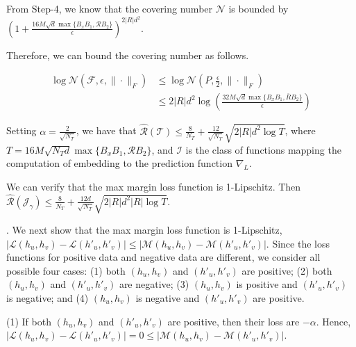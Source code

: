 From Step-4, we know that the covering number ${\mathcal N}$
is bounded by $\left(1+\frac{16M\sqrt d\max\{B_xB_1,{\mathcal R}B_2\}}
{\epsilon}\right)^{2|R|d^2}$.

Therefore, we can bound the covering number as follows.

\begin{align*}
\log \mathcal{N}(\mathcal{F},\epsilon,\|\cdot\|_F)&\leq 
\log \mathcal{N}(P,\frac{\epsilon}{2},\|\cdot\|_F)\\
&
\leq 2|R|d^2\log\left(\frac{32M\sqrt{d}\max\{B_xB_1,\overline{R}
	B_2\}}{\epsilon}\right)
\end{align*}

Setting $\alpha  = \frac{2}{\sqrt{N_T}}$, we have that 
$\hat{\mathcal{R}}(\mathcal{T})\leq\frac{8}{N_T}+
\frac{12}{\sqrt{N_T}}\sqrt{2|R|d^2\log T}$,
where $T=16M\sqrt{{N_T}d}\max\{B_xB_1,{\mathcal R}B_2\}$,
and $\mathcal{I}$ is the class of functions
mapping the computation of embedding to the prediction function $\nabla_{L}$.

We can verify that the max margin loss function 
is 1-Lipschitz.
Then ${\hat{\mathcal{R}}(\mathcal{J}_\gamma)}
\leq\frac{8}{N_T}+\frac{12d}{\sqrt{N_T}}
\sqrt{2|R|d^2|R|\log T}$.

.
We next show that the max margin loss function 
is 1-Lipschitz, 
\ie $|{\mathcal L}(h_u,h_v)-{\mathcal L}(h'_u,h'_v)|\leq 
|{\mathcal M}(h_u,h_v)-{\mathcal M}(h'_u,h'_v)|$.
Since the loss functions for positive data and negative data
are different,
we consider all possible four cases:
(1) both $(h_u,h_v)$ and $(h'_u,h'_v)$ are positive;
(2) both $(h_u,h_v)$ and $(h'_u,h'_v)$ are negative;
(3) $(h_u,h_v)$ is positive and $(h'_u,h'_v)$ is negative; and
(4) $(h_u,h_v)$ is negative and $(h'_u,h'_v)$ are positive.



\stab
(1) If both $(h_u,h_v)$ and $(h'_u,h'_v)$ are positive, 
then their loss are $-\alpha$.
Hence, 
$|{\mathcal L}(h_u,h_v)-{\mathcal L}(h'_u,h'_v)| = 0\leq 
|{\mathcal M}(h_u,h_v)-{\mathcal M}(h'_u,h'_v)|$.


